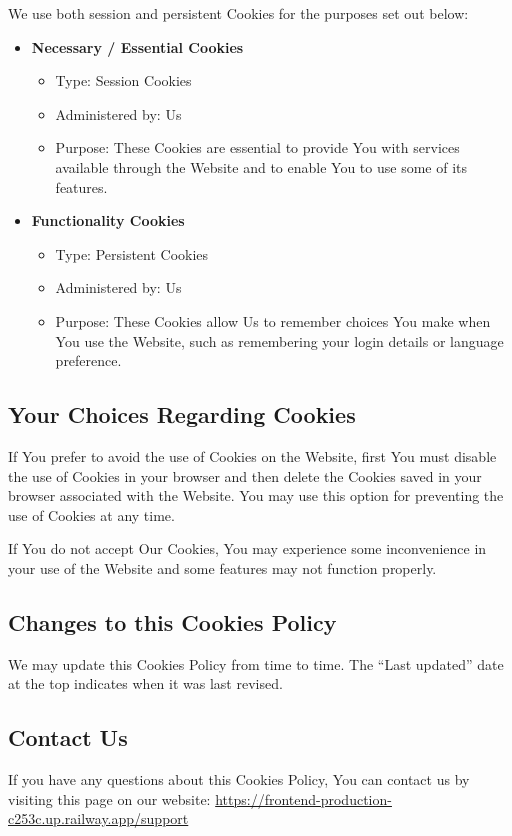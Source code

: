\documentclass[11pt, a4paper]{report}
\begin{document}
\begin{itemize}
We use both session and persistent Cookies for the purposes set out below:

\begin{itemize}
	\item \textbf{Necessary / Essential Cookies}
	\begin{itemize}
		\item Type: Session Cookies
		\item Administered by: Us
		\item Purpose: These Cookies are essential to provide You with services available through the Website and to enable You to use some of its features.
	\end{itemize}
	\item \textbf{Functionality Cookies}
	\begin{itemize}
		\item Type: Persistent Cookies
		\item Administered by: Us
		\item Purpose: These Cookies allow Us to remember choices You make when You use the Website, such as remembering your login details or language preference.
	\end{itemize}
\end{itemize}

\subsection*{Your Choices Regarding Cookies}
If You prefer to avoid the use of Cookies on the Website, first You must disable the use of Cookies in your browser and then delete the Cookies saved in your browser associated with the Website. You may use this option for preventing the use of Cookies at any time.

If You do not accept Our Cookies, You may experience some inconvenience in your use of the Website and some features may not function properly.

\subsection*{Changes to this Cookies Policy}
We may update this Cookies Policy from time to time. The ``Last updated'' date at the top indicates when it was last revised.

\subsection*{Contact Us}
If you have any questions about this Cookies Policy, You can contact us by visiting this page on our website: \url{https://frontend-production-c253c.up.railway.app/support}


\end{itemize}
\end{document}

